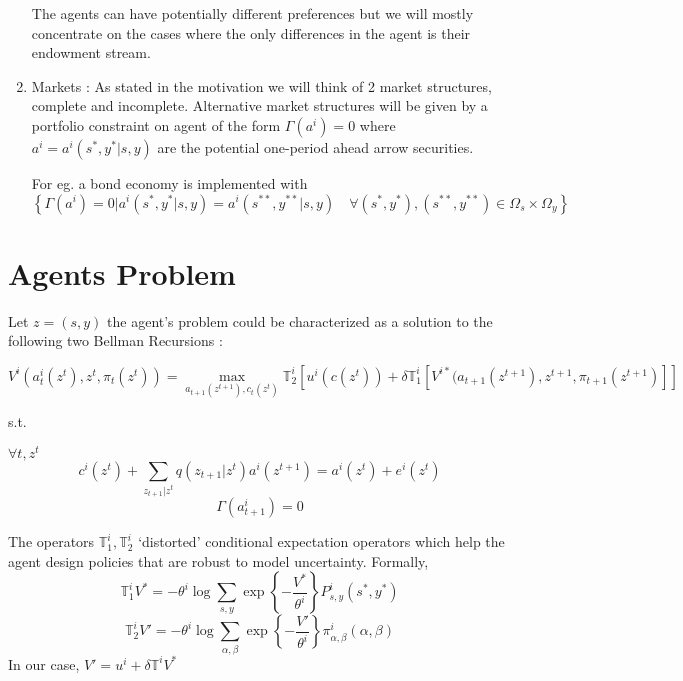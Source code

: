 \documentclass[a4paper,12pt]{article}
\begin{document}
\begin{enumerate}
\begin{itemize}
\end{itemize}

 \noindent The agents can have potentially different preferences but we will mostly concentrate on the cases where the only differences in the agent is their endowment stream.
 
 \item Markets : As stated in the motivation we will think of 2 market structures, complete and incomplete. Alternative market structures will be given by a portfolio constraint on agent of the form $\Gamma(a^i)=0$ where $a^i=a^i(s^*,y^* | s,y)$ are the potential one-period ahead arrow securities. 
 
For eg. a bond economy is implemented with
\[\left\{\Gamma(a^i)=0 | a^i(s^*,y^* | s,y)=a^i(s^{**},y^{**} | s,y) \quad \forall (s^*,y^*) , (s^{**},y^{**}) \in \Omega_s \times \Omega_y \right\}\]

 \end{enumerate}
\section{Agents Problem}
\noindent Let $z=(s,y)$ the agent's problem could be characterized as a solution to the following two Bellman Recursions :

\[V^i(a^i_t(z^t),z^t,\pi_t(z^t))=\max_{a_{t+1}(z^{t+1}),c_t(z^t)}\mathbb{T}^i_2\left[ u^i(c(z^t))+\delta\mathbb{T}^i_1\left[V^{i*}(a_{t+1}(z^{t+1}),z^{t+1},\pi_{t+1}(z^{t+1})\right]\right]\]

s.t.

$\forall t, z^t$
\[c^i(z^t)+\sum_{z_{t+1} | z^t}q(z_{t+1} | z^t)a^i(z^{t+1})=a^i(z^t)+e^i(z^t)\]
\[\Gamma(a_{t+1	}^i)=0\]


\noindent The operators $\mathbb{T}^i_1,\mathbb{T}^i_2$ `distorted' conditional expectation operators which help the agent design policies that are robust to model uncertainty. Formally,
\[\mathbb{T}^i_1 V^* = -\theta^i \log\sum_{s,y} \exp\left\{-\frac{V^*}{\theta^i}\right\}P^i_{s,y}(s^*,y^*)\]
\[\mathbb{T}^i_2 V' = -\theta^i \log\sum_{\alpha,\beta} \exp\left\{-\frac{V'}{\theta^i}\right\}\pi^i_{\alpha,\beta}(\alpha,\beta)\]
In our case, $V'=u^i+\delta\mathbb{T}^i V^*$
	
\end{document}
